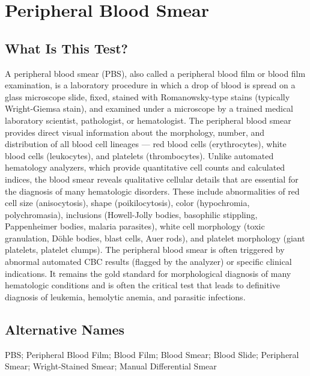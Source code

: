 \chapter{Peripheral Blood Smear}

\section*{What Is This Test?}
A peripheral blood smear (PBS), also called a peripheral blood film or blood film examination, is a laboratory procedure in which a drop of blood is spread on a glass microscope slide, fixed, stained with Romanowsky-type stains (typically Wright-Giemsa stain), and examined under a microscope by a trained medical laboratory scientist, pathologist, or hematologist. The peripheral blood smear provides direct visual information about the morphology, number, and distribution of all blood cell lineages --- red blood cells (erythrocytes), white blood cells (leukocytes), and platelets (thrombocytes). Unlike automated hematology analyzers, which provide quantitative cell counts and calculated indices, the blood smear reveals qualitative cellular details that are essential for the diagnosis of many hematologic disorders. These include abnormalities of red cell size (anisocytosis), shape (poikilocytosis), color (hypochromia, polychromasia), inclusions (Howell-Jolly bodies, basophilic stippling, Pappenheimer bodies, malaria parasites), white cell morphology (toxic granulation, D\"{o}hle bodies, blast cells, Auer rods), and platelet morphology (giant platelets, platelet clumps). The peripheral blood smear is often triggered by abnormal automated CBC results (flagged by the analyzer) or specific clinical indications. It remains the gold standard for morphological diagnosis of many hematologic conditions and is often the critical test that leads to definitive diagnosis of leukemia, hemolytic anemia, and parasitic infections.

\section*{Alternative Names}
PBS; Peripheral Blood Film; Blood Film; Blood Smear; Blood Slide; Peripheral Smear; Wright-Stained Smear; Manual Differential Smear

